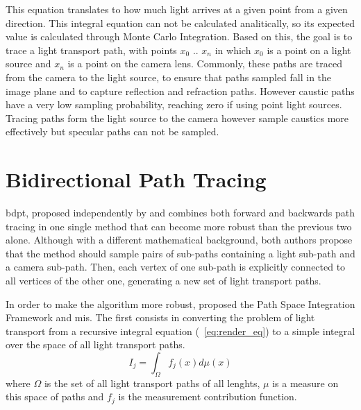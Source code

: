 This equation translates to how much light arrives at a given point from a given direction. This integral equation can not be calculated analitically, so its expected value is calculated through Monte Carlo Integration. Based on this, the goal is to trace a light transport path, with points $x_0$ .. $x_n$ in which $x_0$ is a point on a light source and $x_n$ is a point on the camera lens. 
Commonly, these paths are traced from the camera to the light source, to ensure that paths sampled fall in the image plane and to capture reflection and refraction paths. However caustic paths have a very low sampling probability, reaching zero if using point light sources. Tracing paths form the light source to the camera however sample caustics more effectively but specular paths can not be sampled.

\section{Bidirectional Path Tracing}

\gls{bdpt}, proposed independently by \cite{Veach} and \cite{Lafortune} combines both forward and backwards path tracing in one single method that can become more robust than the previous two alone. Although with a different mathematical background, both authors propose that the method should sample pairs of sub-paths containing a light sub-path and a camera sub-path. Then, each vertex of one sub-path is explicitly connected to all vertices of the other one, generating a new set of light transport paths.

In order to make the algorithm more robust, \cite{Veach} proposed the Path Space Integration Framework and \gls{mis}. The first consists in converting the problem of light transport from a recursive integral equation (~\ref{eq:render_eq}) to a simple integral over the space of all light transport paths.
\begin{equation}
I_j=\int_\Omega f_j(x)d\mu (x)
\label{eq:path_int}
\end{equation}
where $\Omega$ is the set of all light transport paths of all lenghts, $\mu$ is a measure on this space of paths and $f_j$ is the measurement contribution function.

